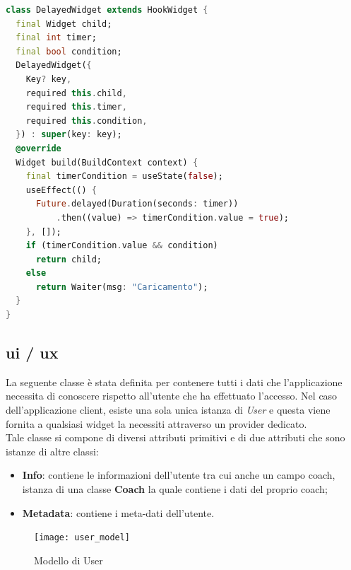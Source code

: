 \begin{lstlisting}[language=dart, firstnumber=1,caption={Classe DelayedWidget}]
class DelayedWidget extends HookWidget {
  final Widget child;
  final int timer;
  final bool condition;
  DelayedWidget({
    Key? key,
    required this.child,
    required this.timer,
    required this.condition,
  }) : super(key: key);
  @override
  Widget build(BuildContext context) {
    final timerCondition = useState(false);
    useEffect(() {
      Future.delayed(Duration(seconds: timer))
          .then((value) => timerCondition.value = true);
    }, []);
    if (timerCondition.value && condition)
      return child;
    else
      return Waiter(msg: "Caricamento");
  }
}
\end{lstlisting}

\subsection{ui / ux}
La seguente classe è stata definita per contenere tutti i dati che l'applicazione necessita di conoscere rispetto all'utente che ha effettuato l'accesso. Nel caso dell'applicazione client, esiste una sola unica istanza di \textit{User} e questa viene fornita a qualsiasi widget la necessiti attraverso un provider dedicato.\\
Tale classe si compone di diversi attributi primitivi e di due attributi che sono istanze di altre classi:
\begin{itemize}
    \item \textbf{Info}: contiene le informazioni dell'utente tra cui anche un campo coach, istanza di una classe \textbf{Coach} la quale contiene i dati del proprio coach;
    \item \textbf{Metadata}: contiene i meta-dati dell'utente.
\end{itemize}
\begin{figure}[h]
    \centering
    \texttt{[image: user\_model]}
    \caption{Modello di User}
\end{figure}
